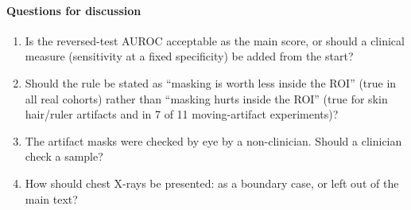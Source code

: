 \documentclass[11pt,a4paper]{article}
\begin{document}
\FloatBarrier\paragraph{Questions for discussion}
\begin{enumerate}[itemsep=1pt,topsep=2pt]
\item Is the reversed-test AUROC acceptable as the main score, or should a clinical measure (sensitivity at a fixed
specificity) be added from the start?
\item Should the rule be stated as ``masking is worth less inside the ROI'' (true in all real cohorts) rather than
``masking hurts inside the ROI'' (true for skin hair/ruler artifacts and in 7 of 11 moving-artifact experiments)?
\item The artifact masks were checked by eye by a non-clinician. Should a clinician check a sample?
\item How should chest X-rays be presented: as a boundary case, or left out of the main text?
\end{enumerate}

\renewcommand{\bibfont}{\footnotesize}\setlength{\bibsep}{0pt}


\end{document}
